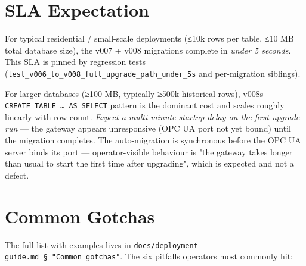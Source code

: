 \section{SLA Expectation}\label{sec-upgrade-sla}

For typical residential / small-scale deployments (≤10k rows per table, ≤10 MB total database size), the v007 + v008 migrations complete in \emph{under 5 seconds}. This SLA is pinned by regression tests (\texttt{test\_v006\_to\_v008\_full\_upgrade\_path\_under\_5s} and per-migration siblings).

For larger databases (≥100 MB, typically ≥500k historical rows), v008\textquotesingle s \texttt{CREATE\ TABLE\ …\ AS\ SELECT} pattern is the dominant cost and scales roughly linearly with row count. \emph{Expect a multi-minute startup delay on the first upgrade run} --- the gateway appears unresponsive (OPC UA port not yet bound) until the migration completes. The auto-migration is synchronous before the OPC UA server binds its port --- operator-visible behaviour is "the gateway takes longer than usual to start the first time after upgrading", which is expected and not a defect.

\section{Common Gotchas}\label{sec-upgrade-gotchas}

The full list with examples lives in \texttt{docs/deployment-guide.md\ §\ "Common\ gotchas"}. The six pitfalls operators most commonly hit:


